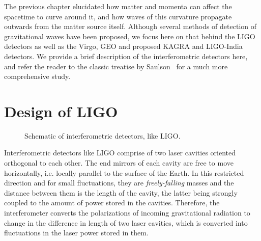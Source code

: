 
The previous chapter elucidated how matter and momenta can affect the spacetime
to curve around it, and how waves of this curvature propagate outwards from 
the matter source itself. Although several methods of detection of gravitational 
waves have been proposed, we focus here on 
that behind the LIGO detectors as well as the Virgo, GEO and proposed KAGRA
and LIGO-India detectors. We provide a brief description of the interferometric
detectors here, and refer the reader to the classic treatise by 
Saulson~\cite{Saulson:1995zi} for a much more comprehensive study. 

\section{Design of LIGO}\label{sec:ligo_construction}
\begin{figure}
 \begin{center}
 \end{center}
\label{fig:ligo}
\caption{Schematic of interferometric detectors, like LIGO.}
\end{figure}
%
Interferometric detectors like LIGO comprise of two laser cavities oriented 
orthogonal to each other. The end mirrors of each cavity are free to move 
horizontally, i.e. locally parallel to the surface of the Earth. In this 
restricted direction and for small fluctuations, they are {\it freely-falling}
masses and the distance between them is
the length of the cavity, the latter being strongly coupled to the amount of
power stored in the cavities. Therefore, the interferometer converts the 
polarizations of incoming gravitational radiation to change in the difference 
in length of two laser cavities, which is converted into fluctuations in the
laser power stored in them. 

